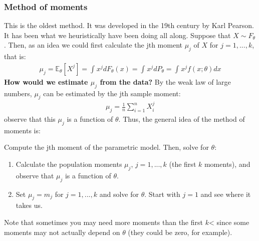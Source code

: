\documentclass[11pt]{scrartcl}
\theoremstyle{definition}
\theoremstyle{remark}
\newcommand{\EXth}[1]{\mathbb{E}_\theta \left[ #1 \right]}
\newcommand{\idx}[2]{\int_{#1}^{#2}}
\begin{document}
{\subsubsection{Method of moments}
	This is the oldest method. It was developed in the 19th century by Karl Pearson. It has been what we heuristically have been doing all along. Suppose that $X \sim F_\theta$. Then, as an idea we could first calculate the jth moment $\mu_j$ of $X$ for $j=1,..., k$, that is: 
	\begin{align*}
			\mu_j = \EXth{X^j} = \idx{}{} x^j dF_\theta (x) = \idx{}{} x^j dP_\theta = \idx{}{} x^j f(x; \theta) dx  
	\end{align*}
	\textbf{How would we estimate $\mu_j$ from the data?} By the weak law of large numbers, $\mu_j$ can be estimated by the jth sample moment: 
	\begin{align*}
		\mu_j = \frac{1}{n} \sum_{i=1}^n X_i^j 	
	\end{align*}
	observe that this $\mu_j$ is a function of $\theta$. Thus, the general idea of the method of moments is: 
	\begin{center}
		Compute the jth moment of the parametric model. Then, solve for $\theta$: 
		\begin{enumerate}[noitemsep]
			\item Calculate the population moments $\mu_j$, $j=1,..., k$ (the first $k$ moments), and observe that $\mu_j$ is a function of $\theta$. 
			\item Set $\mu_j = m_j$ for $j=1,..., k$ and solve for $\theta$. Start with $j=1$ and see where it takes us. 
		\end{enumerate}
	\end{center}
	Note that sometimes you may need more moments than the first $k$< since some moments may not actually depend on $\theta$ (they could be zero, for example). 
	
}
\end{document}
